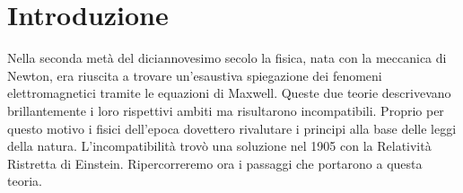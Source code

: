\chapter{Introduzione}
Nella seconda metà del diciannovesimo secolo la fisica, nata con la meccanica di Newton, era riuscita a trovare un'esaustiva spiegazione dei fenomeni elettromagnetici tramite le equazioni di Maxwell. Queste due teorie descrivevano brillantemente i loro rispettivi ambiti ma risultarono incompatibili. Proprio per questo motivo i fisici dell'epoca dovettero rivalutare i principi alla base delle leggi della natura. L'incompatibilità trovò una soluzione nel 1905 con la Relatività Ristretta di Einstein. Ripercorreremo ora i passaggi che portarono a questa teoria.


